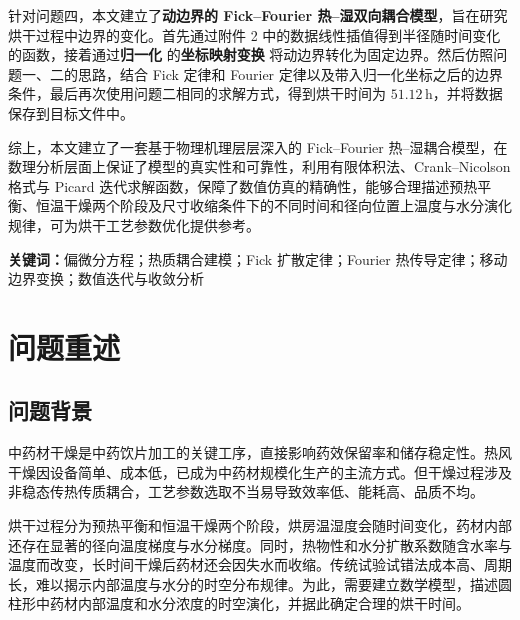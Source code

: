 \documentclass[12pt,a4paper]{article}
\newcommand{\keywords}[1]{\textbf{关键词：}#1}
\begin{document}
针对问题四，本文建立了\textbf{动边界的 Fick--Fourier 热--湿双向耦合模型}，旨在研究烘干过程中边界的变化。首先通过附件 2 中的数据线性插值得到半径随时间变化的函数，接着通过\textbf{归一化} 的\textbf{坐标映射变换} 将动边界转化为固定边界。然后仿照问题一、二的思路，结合 Fick 定律和 Fourier 定律以及带入归一化坐标之后的边界条件，最后再次使用问题二相同的求解方式，得到烘干时间为 \(51.12\,\mathrm{h}\)，并将数据保存到目标文件中。

综上，本文建立了一套基于物理机理层层深入的 Fick--Fourier 热--湿耦合模型，在数理分析层面上保证了模型的真实性和可靠性，利用有限体积法、Crank--Nicolson 格式与 Picard 迭代求解函数，保障了数值仿真的精确性，能够合理描述预热平衡、恒温干燥两个阶段及尺寸收缩条件下的不同时间和径向位置上温度与水分演化规律，可为烘干工艺参数优化提供参考。


\noindent
\hspace*{2em}\textbf{关键词：}偏微分方程；热质耦合建模；Fick 扩散定律；Fourier 热传导定律；移动边界变换；数值迭代与收敛分析

	
	\vspace{45em}
	
	
	
	
	\vspace{0.8cm}
	
	
	\clearpage
	\setcounter{page}{1}    %

	\section{问题重述}
	
\subsection{问题背景}


中药材干燥是中药饮片加工的关键工序，直接影响药效保留率和储存稳定性。热风干燥因设备简单、成本低，已成为中药材规模化生产的主流方式。但干燥过程涉及非稳态传热传质耦合，工艺参数选取不当易导致效率低、能耗高、品质不均。

烘干过程分为预热平衡和恒温干燥两个阶段，烘房温湿度会随时间变化，药材内部还存在显著的径向温度梯度与水分梯度。同时，热物性和水分扩散系数随含水率与温度而改变，长时间干燥后药材还会因失水而收缩。传统试验试错法成本高、周期长，难以揭示内部温度与水分的时空分布规律。为此，需要建立数学模型，描述圆柱形中药材内部温度和水分浓度的时空演化，并据此确定合理的烘干时间。
\end{document}
